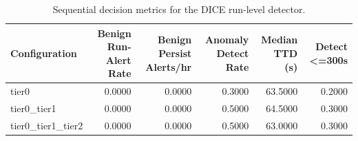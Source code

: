 \begin{table}[t]
\centering
\caption{Sequential decision metrics for the DICE run-level detector.}
\label{tab:dice_sequential_metrics}
\footnotesize
\begin{tabular}{lrrrrr}
\toprule
Configuration & Benign Run-Alert Rate & Benign Persist Alerts/hr & Anomaly Detect Rate & Median TTD (s) & Detect <=300s \\
\midrule
tier0 & 0.0000 & 0.0000 & 0.3000 & 63.5000 & 0.2000 \\
tier0_tier1 & 0.0000 & 0.0000 & 0.5000 & 64.5000 & 0.3000 \\
tier0_tier1_tier2 & 0.0000 & 0.0000 & 0.5000 & 63.0000 & 0.3000 \\
\bottomrule
\end{tabular}

\end{table}
